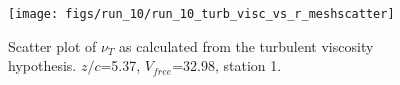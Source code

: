 \begin{figure}[H]
\centering
\texttt{[image: figs/run\_10/run\_10\_turb\_visc\_vs\_r\_meshscatter]}
\caption{Scatter plot of $\nu_T$ as calculated from the turbulent viscosity hypothesis. $z/c$=5.37, $V_{free}$=32.98, station 1.}
\label{fig:run_10_turb_visc_vs_r_meshscatter}
\end{figure}


